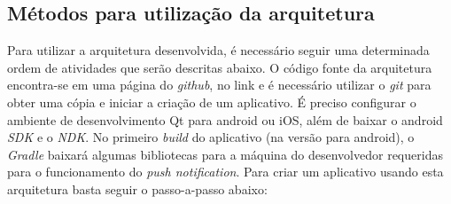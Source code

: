 \subsection{Métodos para utilização da arquitetura}
Para utilizar a arquitetura desenvolvida, é necessário seguir uma determinada ordem de atividades que serão descritas abaixo. O código fonte da arquitetura encontra-se em uma página do \textit{github}, no link \cite{codigo_fonte_url} e é necessário utilizar o \textit{git} para obter uma cópia e iniciar a criação de um aplicativo. É preciso configurar o ambiente de desenvolvimento Qt para android ou iOS, além de baixar o android \textit{SDK} e o \textit{NDK}. No primeiro \textit{build} do aplicativo (na versão para android), o \textit{Gradle} baixará algumas bibliotecas para a máquina do desenvolvedor requeridas para o funcionamento do \textit{push notification}. Para criar um aplicativo usando esta arquitetura basta seguir o passo-a-passo abaixo:\par

